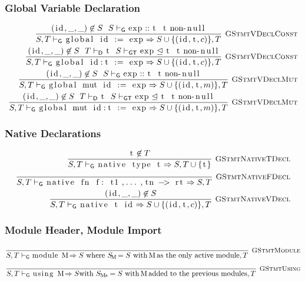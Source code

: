 \documentclass{article}
\newcommand{\code}[1]{\lstinline[columns=fixed]{#1}}
\newcommand{\drmrule}[5]{\frac{#1}{#2\vdash_{\mathsf{#3}}#4}\textsc{\ \small{#5}}}
\newcommand{\ruleapp}[1]{\vdash_{\mathsf{#1}}}
\newcommand{\mc}[1]{\textnormal{\code{#1}}}
\begin{document}
			\subsubsection{Global Variable Declaration}
			
				\begin{align*}
					\drmrule{(\mc{id},\_,\_) \not\in S\ \ S\ruleapp{G}\mc{exp} :: \mc{t}\ \ \mc{t}\textnormal{ non-\code{null}}}{S,T}{G}{\mc{global id := exp} \Rightarrow S\cup\{(\mc{id},\mc{t},c)\},T}{GStmtVDeclConst}\\
					\drmrule{(\mc{id},\_,\_) \not\in S\ \ T\ruleapp{D}\mc{t}\ \ S\ruleapp{GT}\mc{exp}\trianglelefteq\mc{t}\ \ \mc{t}\textnormal{ non-\code{null}}}{S,T}{G}{\mc{global id:t := exp} \Rightarrow S\cup\{(\mc{id},\mc{t},c)\},T}{GStmtVDeclConst}\\
					\drmrule{(\mc{id},\_,\_) \not\in S\ \ S\ruleapp{G}\mc{exp} :: \mc{t}\ \ \mc{t}\textnormal{ non-\code{null}}}{S,T}{G}{\mc{global mut id := exp} \Rightarrow S\cup\{(\mc{id},\mc{t},m)\},T}{GStmtVDeclMut}\\
					\drmrule{(\mc{id},\_,\_) \not\in S\ \ T\ruleapp{D}\mc{t}\ \ S\ruleapp{GT}\mc{exp}\trianglelefteq\mc{t}\ \ \mc{t}\textnormal{ non-\code{null}}}{S,T}{G}{\mc{global mut id:t := exp} \Rightarrow S\cup\{(\mc{id},\mc{t},m)\},T}{GStmtVDeclMut}
				\end{align*}
				
			\subsubsection{Native Declarations}
			
				\begin{align*}
					\drmrule{\mc{t}\not\in T}{S,T}{G}{\mc{native type t} \Rightarrow S,T\cup\{\mc{t}\}}{GStmtNativeTDecl}\\
					\drmrule{}{S,T}{G}{\mc{native fn f: t1,...,tn -> rt} \Rightarrow S,T}{GStmtNativeFDecl}\\
					\drmrule{(\mc{id},\_,\_)\not\in S}{S,T}{G}{\mc{native t id} \Rightarrow S\cup\{(\mc{id},\mc{t},c)\},T}{GStmtNativeVDecl}
				\end{align*}
				
			\subsubsection{Module Header, Module Import}
			
				\begin{align*}
					\drmrule{}{S,T}{G}{\mc{module M} \Rightarrow S \textnormal{ where $S_{\mc{M}} = S$ with \code{M} as the only active module},T}{GStmtModule}
				\end{align*}\begin{align*}
					\drmrule{}{S,T}{G}{\mc{using M} \Rightarrow S \textnormal{with $S_{\mc{Ms}} = S$ with \code{M} added to the previous modules}, T}{GStmtUsing}
				\end{align*}
			
\end{document}
